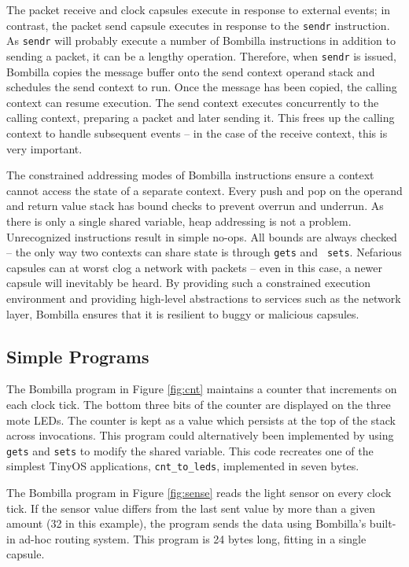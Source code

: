 \documentclass[10pt]{article}
\begin{document}
The packet receive and clock capsules execute in response to external
events; in contrast, the packet send capsule executes in response to
the {\tt sendr} instruction. As {\tt sendr} will probably execute a
number of Bombilla instructions in addition to sending a packet, it can
be a lengthy operation. Therefore, when {\tt sendr} is issued, Bombilla
copies the message buffer onto the send context operand stack and
schedules the send context to run. Once the message has been copied,
the calling context can resume execution. The send context executes
concurrently to the calling context, preparing a packet and later
sending it. This frees up the calling context to handle subsequent
events -- in the case of the receive context, this is very important.

The constrained addressing modes of Bombilla instructions ensure a
context cannot access the state of a separate context. Every push and
pop on the operand and return value stack has bound checks to prevent
overrun and underrun. As there is only a single shared variable, heap
addressing is not a problem. Unrecognized instructions result in
simple no-ops. All bounds are always checked -- the only way two
contexts can share state is through {\tt gets} and {\tt
sets}. Nefarious capsules can at worst clog a network with packets --
even in this case, a newer capsule will inevitably be heard. By
providing such a constrained execution environment and providing
high-level abstractions to services such as the network layer, Bombilla
ensures that it is resilient to buggy or malicious capsules.

\subsection{Simple Programs}
\label{sec:sub:simple}

The Bombilla program in Figure \ref{fig:cnt} maintains a counter that
increments on each clock tick. The bottom three bits of the counter
are displayed on the three mote LEDs. The counter is kept as a value
which persists at the top of the stack across invocations. This
program could alternatively been implemented by using {\tt gets} and
{\tt sets} to modify the shared variable.  This code recreates one of
the simplest TinyOS applications, {\tt cnt\_to\_leds}, implemented in
seven bytes.

The Bombilla program in Figure \ref{fig:sense} reads the light sensor
on every clock tick. If the sensor value differs from the last sent
value by more than a given amount (32 in this example), the program
sends the data using Bombilla's built-in ad-hoc routing system. This
program is 24 bytes long, fitting in a single capsule.
\end{document}
